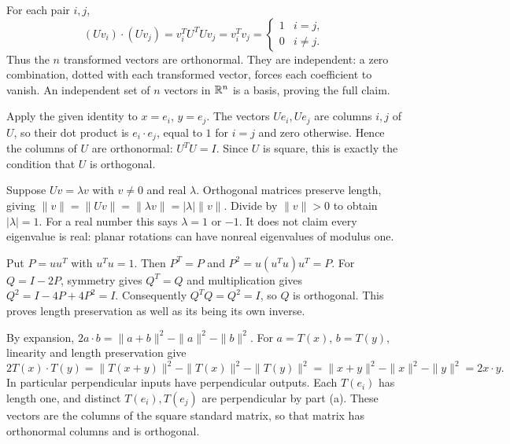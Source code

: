 For each pair $i,j$,
\[
 (Uv_i)\cdot(Uv_j)=v_i^TU^TUv_j=v_i^Tv_j
 =\begin{cases}1&i=j,\\0&i\ne j.\end{cases}
\]
Thus the $n$ transformed vectors are orthonormal. They are independent:
a zero combination, dotted with each transformed vector, forces each
coefficient to vanish. An independent set of $n$ vectors in $\mathbb{R}^n$
is a basis, proving the full claim.

Apply the given identity to $x=e_i$, $y=e_j$.
The vectors $Ue_i,Ue_j$ are columns $i,j$ of $U$, so their dot product
is $e_i\cdot e_j$, equal to $1$ for $i=j$ and zero otherwise.
Hence the columns of $U$ are orthonormal: $U^TU=I$.
Since $U$ is square, this is exactly the condition that $U$ is orthogonal.

Suppose $Uv=\lambda v$ with $v\ne0$ and real $\lambda$.
Orthogonal matrices preserve length, giving
$\|v\|=\|Uv\|=\|\lambda v\|=|\lambda|\|v\|$.
Divide by $\|v\|>0$ to obtain $|\lambda|=1$.
For a real number this says $\lambda=1$ or $-1$.
It does not claim every eigenvalue is real: planar rotations can have
nonreal eigenvalues of modulus one.

Put $P=uu^T$ with $u^Tu=1$. Then
$P^T=P$ and $P^2=u(u^Tu)u^T=P$.
For $Q=I-2P$, symmetry gives $Q^T=Q$ and multiplication gives
$Q^2=I-4P+4P^2=I$.
Consequently $Q^TQ=Q^2=I$, so $Q$ is orthogonal.
This proves length preservation as well as its being its own inverse.

By expansion,
$2a\cdot b=\|a+b\|^2-\|a\|^2-\|b\|^2$.
For $a=T(x)$, $b=T(y)$, linearity and length preservation give
\[
 2T(x)\cdot T(y)
 =\|T(x+y)\|^2-\|T(x)\|^2-\|T(y)\|^2
 =\|x+y\|^2-\|x\|^2-\|y\|^2=2x\cdot y.
\]
In particular perpendicular inputs have perpendicular outputs.
Each $T(e_i)$ has length one, and distinct $T(e_i),T(e_j)$ are
perpendicular by part (a). These vectors are the columns of the square
standard matrix, so that matrix has orthonormal columns and is orthogonal.

